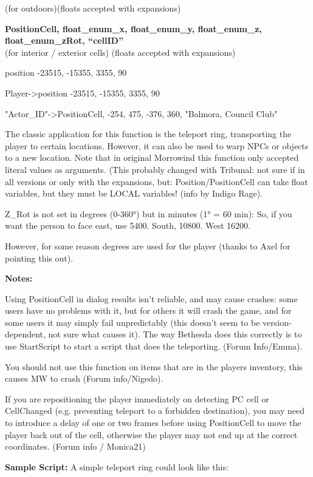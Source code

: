 \documentclass[
]{article}
\begin{document}
(for outdoors)(floats accepted with expansions)

\textbf{PositionCell, float\_enum\_x, float\_enum\_y, float\_enum\_z,
float\_enum\_zRot, ``cellID''\\
}(for interior / exterior cells) (floats accepted with expansions)

position -23515, -15355, 3355, 90

Player-\textgreater position -23515, -15355, 3355, 90

"Actor\_ID"-\textgreater PositionCell, -254, 475, -376, 360, "Balmora,
Council Club"

The classic application for this function is the teleport ring,
transporting the player to certain locations. However, it can also be
used to warp NPCs or objects to a new location. Note that in original
Morrowind this function only accepted literal values as arguments. (This
probably changed with Tribunal: not sure if in all versions or only with
the expansions, but: Position/PositionCell can take float variables, but
they must be LOCAL variables! (info by Indigo Rage).

Z\_Rot is not set in degrees (0-360°) but in minutes (1° = 60 min): So,
if you want the person to face east, use 5400. South, 10800. West 16200.

However, for some reason degrees are used for the player (thanks to Axel
for pointing this out).

\textbf{Notes:}

Using PositionCell in dialog results isn't reliable, and may cause
crashes: some users have no problems with it, but for others it will
crash the game, and for some users it may simply fail unpredictably
(this doesn't seem to be version-dependent, not sure what causes it).
The way Bethesda does this correctly is to use StartScript to start a
script that does the teleporting. (Forum Info/Emma).

You should not use this function on items that are in the players
inventory, this causes MW to crash (Forum info/Nigedo).

If you are repositioning the player immediately on detecting PC cell or
CellChanged (e.g. preventing teleport to a forbidden destination), you
may need to introduce a delay of one or two frames before using
PositionCell to move the player back out of the cell, otherwise the
player may not end up at the correct coordinates. (Forum info /
Monica21)

\textbf{Sample Script:} A simple teleport ring could look like this:
\end{document}
